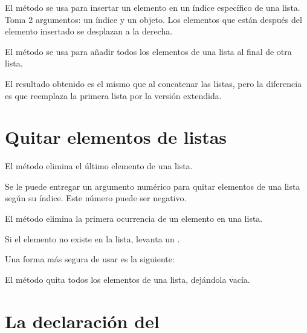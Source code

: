 El método  se usa para insertar un elemento en un índice específico de una lista.
Toma 2 argumentos: un índice y un objeto.
Los elementos que están después del elemento insertado se desplazan a la derecha.


El método  se usa para añadir todos los elementos de una lista al final de otra lista.
  

El resultado obtenido es el mismo que al concatenar las listas, pero la diferencia es que reemplaza la primera lista por la versión extendida.

\section{Quitar elementos de listas}

El método  elimina el último elemento de una lista.
  

Se le puede entregar un argumento numérico para quitar elementos de una lista según su índice.
Este número puede ser negativo.


El método  elimina la primera ocurrencia de un elemento en una lista.
  

Si el elemento no existe en la lista, levanta un .


Una forma más segura de usar  es la siguiente:


El método  quita todos los elementos de una lista, dejándola vacía.


\section{La declaración del}

